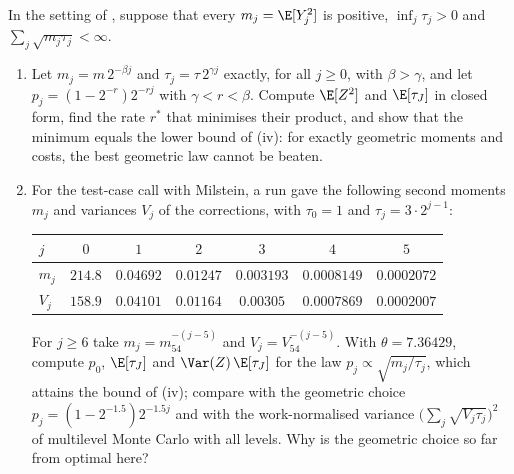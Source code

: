\begin{exercise}\label{ex:ml-randomisation}
\hard In the setting of , suppose that every $m_j=\E[Y_j^2]$ is positive,
$\inf_j\tau_j>0$ and $\sum_j\sqrt{m_j\tau_j}<\infty$.
\begin{enumerate}[label=(\alph*)]
  \item Let $m_j=m\,2^{-\beta j}$ and $\tau_j=\tau\,2^{\gamma j}$ exactly, for all $j\ge0$, with
    $\beta>\gamma$, and let $p_j=(1-2^{-r})2^{-rj}$ with $\gamma<r<\beta$. Compute $\E[Z^2]$ and
    $\E[\tau_J]$ in closed form, find the rate $r^*$ that minimises their product, and show that
    the minimum equals the lower bound of (iv): for exactly geometric
    moments and costs, the best geometric law cannot be beaten.
  \item For the test-case call with Milstein, a run gave the following second moments $m_j$ and
    variances $V_j$ of the corrections, with $\tau_0=1$ and $\tau_j=3\cdot2^{j-1}$:
    \begin{center}
    \begin{tabular}{lcccccc}
    \toprule
    $j$ & $0$ & $1$ & $2$ & $3$ & $4$ & $5$\\
    \midrule
    $m_j$ & $214.8$ & $0.04692$ & $0.01247$ & $0.003193$ & $0.0008149$ & $0.0002072$\\
    $V_j$ & $158.9$ & $0.04101$ & $0.01164$ & $0.00305$ & $0.0007869$ & $0.0002007$\\
    \bottomrule
    \end{tabular}
    \end{center}
    For $j\ge6$ take $m_j=m_54^{-(j-5)}$ and $V_j=V_54^{-(j-5)}$. With $\theta=7.36429$, compute
    $p_0$, $\E[\tau_J]$ and $\Var(Z)\,\E[\tau_J]$ for the law $p_j\propto\sqrt{m_j/\tau_j}$, which
    attains the bound of (iv);
    compare with the geometric choice $p_j=(1-2^{-1.5})2^{-1.5j}$ and with the work-normalised
    variance $\big(\sum_j\sqrt{V_j\tau_j}\big)^2$ of multilevel Monte Carlo with all levels. Why
    is the geometric choice so far from optimal here?
\end{enumerate}
\end{exercise}


